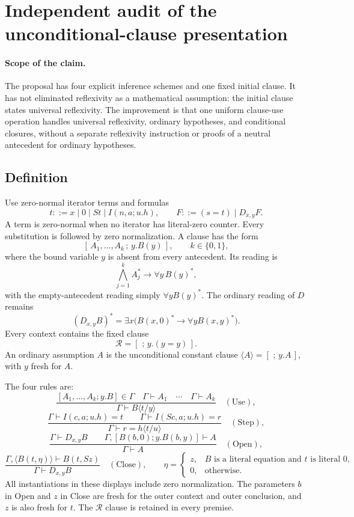 \section{Independent audit of the unconditional-clause presentation}

\paragraph{Scope of the claim.}
The proposal has four explicit inference schemes and one fixed initial
clause. It has not eliminated reflexivity as a mathematical assumption:
the initial clause states universal reflexivity. The improvement is that
one uniform clause-use operation handles universal reflexivity, ordinary
hypotheses, and conditional closures, without a separate reflexivity
instruction or proofs of a neutral antecedent for ordinary hypotheses.

\subsection{Definition}
Use zero-normal iterator terms and formulas
\[
 t::=x\mid 0\mid St\mid I(n,a;u.h),\qquad
 F::=(s=t)\mid D_{x,y}F.
\]
A term is zero-normal when no iterator has literal-zero counter.
Every substitution is followed by zero normalization.
A clause has the form
\[
 [\,A_1,\ldots,A_k\,;\,y.B(y)\,],\qquad k\in\{0,1\},
\]
where the bound variable \(y\) is absent from every antecedent.
Its reading is
\[
 \bigwedge_{j=1}^k A_j^* \longrightarrow \forall y\,B(y)^*,
\]
with the empty-antecedent reading simply \(\forall y B(y)^*\).
The ordinary reading of \(D\) remains
\[
 (D_{x,y}B)^*=\exists x\bigl(B(x,0)^*\to\forall y B(x,y)^*\bigr).
\]
Every context contains the fixed clause
\[
 \mathcal R=[\,\,;\,y.(y=y)\,].
\]
An ordinary assumption \(A\) is the unconditional constant clause
\(\langle A\rangle=[\,\,;\,y.A\,]\), with \(y\) fresh for \(A\).

The four rules are:
\[
 \frac{[A_1,\ldots,A_k;y.B]\in\Gamma\quad
       \Gamma\vdash A_1\quad\cdots\quad\Gamma\vdash A_k}
      {\Gamma\vdash B\langle t/y\rangle}
 \quad(\mathrm{Use}),
\]
\[
 \frac{\Gamma\vdash I(c,a;u.h)=t\qquad
       \Gamma\vdash I(Sc,a;u.h)=r}
      {\Gamma\vdash r=h\langle t/u\rangle}
 \quad(\mathrm{Step}),
\]
\[
 \frac{\Gamma\vdash D_{x,y}B\qquad
       \Gamma,[B(b,0);y.B(b,y)]\vdash A}
      {\Gamma\vdash A}
 \quad(\mathrm{Open}),
\]
\[
 \frac{\Gamma,\langle B(t,\eta)\rangle\vdash B(t,Sz)}
      {\Gamma\vdash D_{x,y}B}
 \quad(\mathrm{Close}),
\qquad
 \eta=\begin{cases}
 z,& B\text{ is a literal equation and }t\text{ is literal }0,\\
 0,&\text{otherwise}.
 \end{cases}
\]
All instantiations in these displays include zero normalization.
The parameters \(b\) in Open and \(z\) in Close are fresh for the
outer context and outer conclusion, and \(z\) is also fresh for \(t\).
The \(\mathcal R\) clause is retained in every premise.

